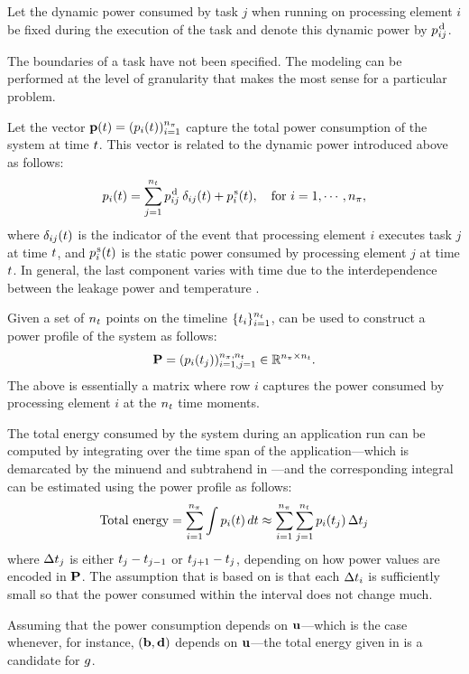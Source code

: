 Let the dynamic power consumed by task $j$ when running on processing element
$i$ be fixed during the execution of the task and denote this dynamic power by
$p^{\text{\kern0.1emd}}_{ij}$.

\begin{remark}
The boundaries of a task have not been specified. The modeling can be performed
at the level of granularity that makes the most sense for a particular problem.
\end{remark}

Let the vector $\mathbf{p}(t) = (p_i(t))_{i = 1}^{{n_\pi}}$ capture the total power
consumption of the system at time $t$. This vector is related to the dynamic
power introduced above as follows:
\begin{equation} \elab{power}
  \p_i(\t) = \sum_{j = 1}^\nt \p^\dynamic_{ij} \: \delta_{ij} (\t) + \p^\static_i(\t), \hspace{1em} \text{for $i = 1, \cdots, \np$},
\end{equation}
where $\delta_{ij}(t)$ is the indicator of the event that processing element
$i$ executes task $j$ at time $t$, and $p^{\text{\kern0.1ems}}_i(t)$ is the static power
consumed by processing element $j$ at time $t$. In general, the last component
varies with time due to the interdependence between the leakage power and
temperature \cite{liu2007}.

Given a set of ${n_t}$ points on the timeline $\{ t_i \}_{i = 1}^{n_t}$,
 can be used to construct a power profile of the system as follows:
\[
  \mathbf{P} = (p_i(t_j))_{i = 1, j = 1}^{{n_\pi}, {n_t}} \in \mathbb{R}^{{n_\pi} \times {n_t}}.
\]
The above is essentially a matrix where row $i$ captures the power consumed by
processing element $i$ at the ${n_t}$ time moments.

The total energy consumed by the system during an application run can be
computed by integrating  over the time span of the
application---which is demarcated by the minuend and subtrahend in
---and the corresponding integral can be estimated using
the power profile as follows:
\begin{equation} \elab{total-energy}
  \text{Total energy} = \sum_{i = 1}^\np \int \p_i(\t) \, d\t \approx \sum_{i = 1}^\np \sum_{j = 1}^\ns \p_i(\t_j) \, \Delta \t_j
\end{equation}
where $\Delta t_j$ is either $t_j - t_{j - 1}$ or $t_{j + 1} - t_j$,
depending on how power values are encoded in $\mathbf{P}$. The assumption that
 is based on is that each $\Delta t_i$ is sufficiently small
so that the power consumed within the interval does not change much.

Assuming that the power consumption depends on $\mathbf{u}$---which is the case
whenever, for instance, $(\mathbf{b}, \mathbf{d})$ depends on $\mathbf{u}$---the total energy given
in  is a candidate for $g$.
